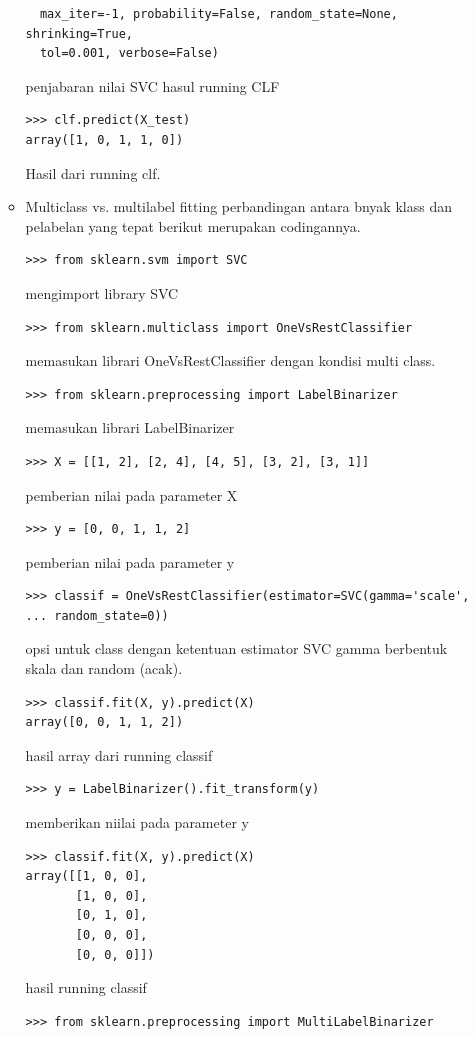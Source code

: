 \begin{enumerate}
\begin{itemize}
\begin{verbatim}
  max_iter=-1, probability=False, random_state=None, shrinking=True,
  tol=0.001, verbose=False)
\end{verbatim}
penjabaran nilai SVC hasul running CLF
\begin{verbatim}
>>> clf.predict(X_test)
array([1, 0, 1, 1, 0])
\end{verbatim}
Hasil dari  running clf.
\item
Multiclass vs. multilabel fitting
perbandingan antara bnyak klass dan pelabelan yang tepat berikut merupakan codingannya.
\begin{verbatim}
>>> from sklearn.svm import SVC
\end{verbatim}
mengimport library SVC
\begin{verbatim}
>>> from sklearn.multiclass import OneVsRestClassifier
\end{verbatim}
memasukan librari OneVsRestClassifier dengan kondisi multi class.
\begin{verbatim} 
>>> from sklearn.preprocessing import LabelBinarizer
\end{verbatim}
memasukan librari  LabelBinarizer
\begin{verbatim}
>>> X = [[1, 2], [2, 4], [4, 5], [3, 2], [3, 1]]
\end{verbatim}
pemberian nilai pada parameter X
\begin{verbatim}
>>> y = [0, 0, 1, 1, 2]
\end{verbatim}
pemberian nilai pada parameter y
\begin{verbatim}
>>> classif = OneVsRestClassifier(estimator=SVC(gamma='scale',
... random_state=0))
\end{verbatim}
opsi untuk class dengan ketentuan estimator SVC gamma berbentuk skala dan random (acak).
\begin{verbatim}
>>> classif.fit(X, y).predict(X)
array([0, 0, 1, 1, 2])
\end{verbatim}
hasil array dari running classif
\begin{verbatim}
>>> y = LabelBinarizer().fit_transform(y)
\end{verbatim}
memberikan niilai pada parameter y
\begin{verbatim}
>>> classif.fit(X, y).predict(X)
array([[1, 0, 0],
       [1, 0, 0],
       [0, 1, 0],
       [0, 0, 0],
       [0, 0, 0]])
\end{verbatim}
hasil running classif 
\begin{verbatim}
>>> from sklearn.preprocessing import MultiLabelBinarizer
\end{verbatim}

\end{itemize}
\end{enumerate}

